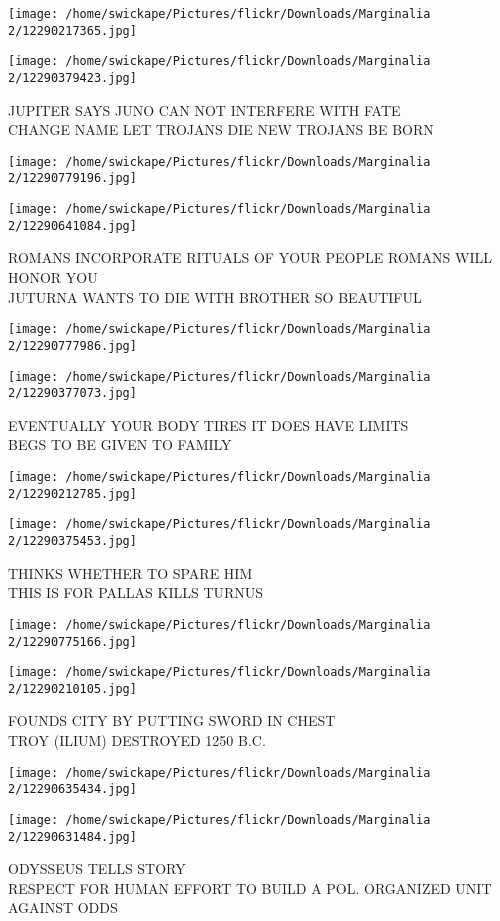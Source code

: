 \documentclass[10pt,letterpaper]{article}
\begin{document}
\texttt{[image: /home/swickape/Pictures/flickr/Downloads/Marginalia 2/12290217365.jpg]}

\vspace{0.25in}
\texttt{[image: /home/swickape/Pictures/flickr/Downloads/Marginalia 2/12290379423.jpg]}

JUPITER SAYS JUNO CAN NOT INTERFERE WITH FATE\\
CHANGE NAME LET TROJANS DIE NEW TROJANS BE BORN\\
\pagebreak

\texttt{[image: /home/swickape/Pictures/flickr/Downloads/Marginalia 2/12290779196.jpg]}

\vspace{0.25in}
\texttt{[image: /home/swickape/Pictures/flickr/Downloads/Marginalia 2/12290641084.jpg]}

ROMANS INCORPORATE RITUALS OF YOUR PEOPLE ROMANS WILL HONOR YOU\\
JUTURNA WANTS TO DIE WITH BROTHER SO BEAUTIFUL\\
\pagebreak

\texttt{[image: /home/swickape/Pictures/flickr/Downloads/Marginalia 2/12290777986.jpg]}

\vspace{0.25in}
\texttt{[image: /home/swickape/Pictures/flickr/Downloads/Marginalia 2/12290377073.jpg]}

EVENTUALLY YOUR BODY TIRES IT DOES HAVE LIMITS\\
BEGS TO BE GIVEN TO FAMILY\\
\pagebreak

\texttt{[image: /home/swickape/Pictures/flickr/Downloads/Marginalia 2/12290212785.jpg]}

\vspace{0.25in}
\texttt{[image: /home/swickape/Pictures/flickr/Downloads/Marginalia 2/12290375453.jpg]}

THINKS WHETHER TO SPARE HIM\\
THIS IS FOR PALLAS KILLS TURNUS\\
\pagebreak

\texttt{[image: /home/swickape/Pictures/flickr/Downloads/Marginalia 2/12290775166.jpg]}

\vspace{0.25in}
\texttt{[image: /home/swickape/Pictures/flickr/Downloads/Marginalia 2/12290210105.jpg]}

FOUNDS CITY BY PUTTING SWORD IN CHEST\\
TROY (ILIUM) DESTROYED 1250 B.C.\\
\pagebreak

\texttt{[image: /home/swickape/Pictures/flickr/Downloads/Marginalia 2/12290635434.jpg]}

\vspace{0.25in}
\texttt{[image: /home/swickape/Pictures/flickr/Downloads/Marginalia 2/12290631484.jpg]}

ODYSSEUS TELLS STORY\\
RESPECT FOR HUMAN EFFORT TO BUILD A POL. ORGANIZED UNIT AGAINST ODDS\\
\pagebreak
\end{document}
